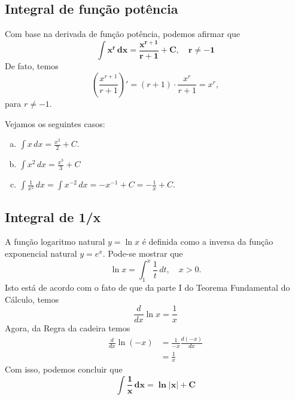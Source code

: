 \cleardoublepage\documentclass[../main.tex]{subfiles}
\begin{document}
\subsection{Integral de função potência}\hypertarget{IntFuncPot}{}\label{subsec:DemPotencia}

Com base na derivada de função potência, podemos afirmar que
\begin{equation}
  \boldsymbol{\int x^r\,dx = \frac{x^{r+1}}{r+1} + C,\quad r\neq -1}
\end{equation}
De fato, temos
\begin{equation*}
  \left(\frac{x^{r+1}}{r+1}\right)' = (r+1)\cdot \frac{x^r}{r+1} = x^r,
\end{equation*}
para $r\neq -1$.

\begin{ex}
  Vejamos os seguintes casos:
  \begin{enumerate}[a)]
  \item $\displaystyle \int x\,dx = \frac{x^2}{2} + C$.
  \item $\int x^2\,dx = \frac{x^3}{3} + C$
  \item $\displaystyle \int \frac{1}{x^2}\,dx = \int x^{-2}\,dx = -x^{-1} + C = -\frac{1}{x}+C$.
  \end{enumerate}
\end{ex}
\subsection{Integral de 1/x}\hypertarget{IntFunc1/x}{}\label{subsec:Dem-1/x}

A função logaritmo natural $y = \ln x$ é definida como a inversa da função exponencial natural $y = e^x$. Pode-se mostrar que
\begin{equation}
  \ln x = \int_1^x\frac{1}{t}\,dt,\quad x>0.
\end{equation}
Isto está de acordo com o fato de que da parte I do Teorema Fundamental do Cálculo, temos
\begin{equation}
  \frac{d}{dx}\ln x = \frac{1}{x}
\end{equation}
Agora, da Regra da cadeira temos
\begin{align*}
  \frac{d}{dx}\ln(-x) &= \frac{1}{-x}\frac{d(-x)}{dx} \\
                      &= \frac{1}{x}
\end{align*}
Com isso, podemos concluir que
\begin{equation}
  \boldsymbol{\int \frac{1}{x}\,dx = \ln|x| + C}
\end{equation}
\end{document}
